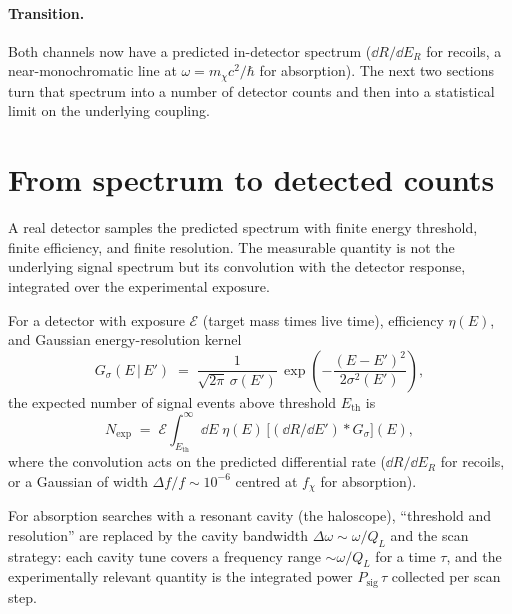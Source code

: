 \paragraph{Transition.}
Both channels now have a predicted in-detector spectrum
($\dd R/\dd E_R$ for recoils, a near-monochromatic line at
$\omega=m_\chi c^2/\hbar$ for absorption). The next two sections
turn that spectrum into a number of detector counts and then into
a statistical limit on the underlying coupling.

\section{From spectrum to detected counts}
\label{sec:detector-response}

\begin{phenomenon}
A real detector samples the predicted spectrum with finite energy
threshold, finite efficiency, and finite resolution. The measurable
quantity is not the underlying signal spectrum but its convolution
with the detector response, integrated over the experimental
exposure.
\end{phenomenon}

\begin{statement}
\label{stmt:N-exp}
For a detector with exposure $\mathcal E$ (target mass times live
time), efficiency $\eta(E)$, and Gaussian energy-resolution kernel
\begin{equation}
G_\sigma(E\,|\,E') \;=\; \frac{1}{\sqrt{2\pi}\,\sigma(E')}\,
\exp\!\left(-\frac{(E-E')^2}{2\sigma^2(E')}\right),
\end{equation}
the expected number of signal events above threshold $E_\text{th}$
is
\begin{equation}
\label{eq:N-exp}
N_\text{exp} \;=\; \mathcal E \int_{E_\text{th}}^\infty\!\!\dd E\;
\eta(E)\,\bigl[(\dd R/\dd E')\!\ast\!G_\sigma\bigr](E),
\end{equation}
where the convolution acts on the predicted differential rate
($\dd R/\dd E_R$ for recoils, or a Gaussian of width
$\Delta f/f\sim 10^{-6}$ centred at $f_\chi$ for absorption).
\end{statement}

\begin{remark}
For absorption searches with a resonant cavity (the haloscope),
``threshold and resolution'' are replaced by the cavity
bandwidth $\Delta\omega\sim\omega/Q_L$ and the scan strategy: each
cavity tune covers a frequency range $\sim\omega/Q_L$ for a time
$\tau$, and the experimentally relevant quantity is the integrated
power $P_\text{sig}\,\tau$ collected per scan step.
\end{remark}

